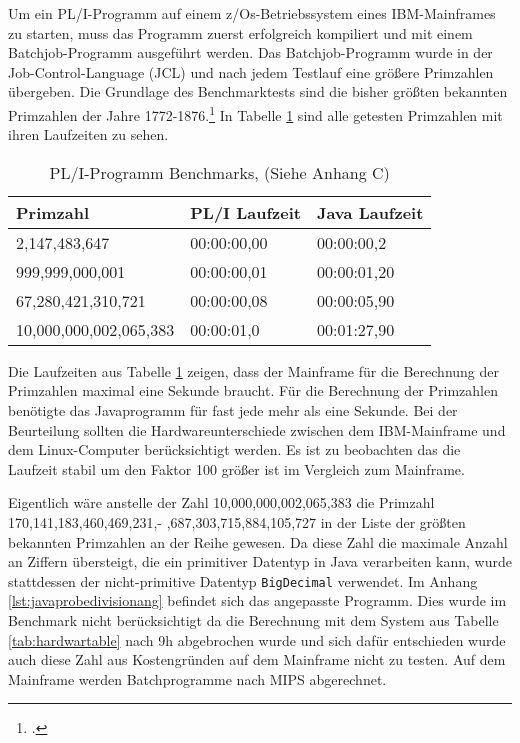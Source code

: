 Um ein PL/I-Programm auf einem z/Os-Betriebssystem eines IBM-Mainframes zu starten, muss das Programm zuerst erfolgreich kompiliert und mit einem Batchjob-Programm ausgeführt werden. Das Batchjob-Programm wurde in der Job-Control-Language (JCL) und nach jedem Testlauf eine größere Primzahlen übergeben.
Die Grundlage des Benchmarktests sind die bisher größten bekannten Primzahlen der Jahre 1772-1876.\footcite[Vgl. ][]{prime} In Tabelle \ref{tab:plibenchmark} sind alle getesten Primzahlen mit ihren Laufzeiten zu sehen. 

\begin{table}[h]
	\centering
	\begin{tabularx}{\textwidth}{|X|X|X|}
		\hline
		\textbf{Primzahl} & \textbf{PL/I Laufzeit} & \textbf{Java Laufzeit} \\
		\hline
		2,147,483,647 & 00:00:00,00 & 00:00:00,2 \\
		
		999,999,000,001 & 00:00:00,01 & 00:00:01,20\\
		
		67,280,421,310,721 & 00:00:00,08 & 00:00:05,90 \\
		
		10,000,000,002,065,383 & 00:00:01,0 & 00:01:27,90 \\
		\hline
	\end{tabularx}
	\caption{PL/I-Programm Benchmarks, (Siehe Anhang C) \label{tab:plibenchmark}}
\end{table}
\pagebreak

Die Laufzeiten aus Tabelle \ref{tab:plibenchmark} zeigen, dass der Mainframe für die Berechnung der Primzahlen maximal eine Sekunde braucht. Für die Berechnung der Primzahlen benötigte das Javaprogramm für fast jede mehr als eine Sekunde. Bei der Beurteilung sollten die Hardwareunterschiede zwischen dem IBM-Mainframe und dem Linux-Computer berücksichtigt werden. Es ist zu beobachten das die Laufzeit stabil um den Faktor 100 größer ist im Vergleich zum Mainframe.

Eigentlich wäre anstelle der Zahl 10,000,000,002,065,383 die Primzahl 170,141,183,460,469,231,- ,687,303,715,884,105,727 in der Liste der größten bekannten Primzahlen an der Reihe gewesen. 
Da diese Zahl die maximale Anzahl an Ziffern übersteigt, die ein primitiver Datentyp in Java verarbeiten kann, wurde stattdessen der nicht-primitive Datentyp \verb+BigDecimal+ verwendet. Im Anhang \ref{lst:javaprobedivisionang} befindet sich das angepasste Programm. 
Dies wurde im Benchmark nicht berücksichtigt da die Berechnung mit dem System aus Tabelle \ref{tab:hardwartable} nach 9h abgebrochen wurde und sich dafür entschieden wurde auch diese Zahl aus Kostengründen auf dem Mainframe nicht zu testen. Auf dem Mainframe werden Batchprogramme nach \ac{MIPS} abgerechnet.

